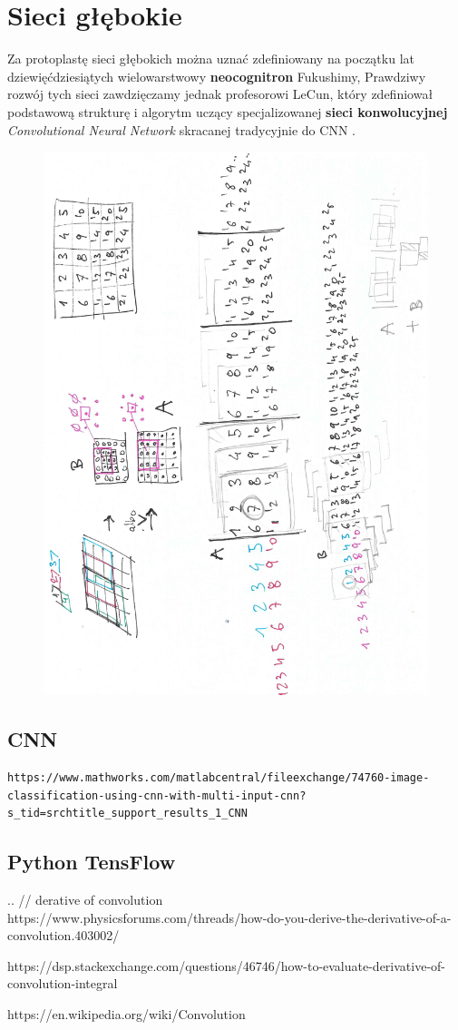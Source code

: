 
\chapter{Sieci głębokie}
Za protoplastę sieci głębokich można uznać zdefiniowany na początku lat dziewięćdziesiątych wielowarstwowy \textbf{neocognitron} Fukushimy, Prawdziwy rozwój tych sieci zawdzięczamy jednak profesorowi LeCun, który zdefiniował podstawową strukturę i algorytm uczący specjalizowanej \textbf{sieci konwolucyjnej} \textit{Convolutional Neural Network} skracanej tradycyjnie do CNN \cite{ossowski2023}. 

\begin{figure}[h]
    	\centering 
            \includegraphics[width=0.70\linewidth]{gfx/scan01.pdf} 
\end{figure} 

\section{CNN}
\begin{lstlisting}
https://www.mathworks.com/matlabcentral/fileexchange/74760-image-classification-using-cnn-with-multi-input-cnn?s_tid=srchtitle_support_results_1_CNN
\end{lstlisting}

\section{Python TensFlow}
..
// derative of convolution \\

https://www.physicsforums.com/threads/how-do-you-derive-the-derivative-of-a-convolution.403002/

https://dsp.stackexchange.com/questions/46746/how-to-evaluate-derivative-of-convolution-integral

https://en.wikipedia.org/wiki/Convolution